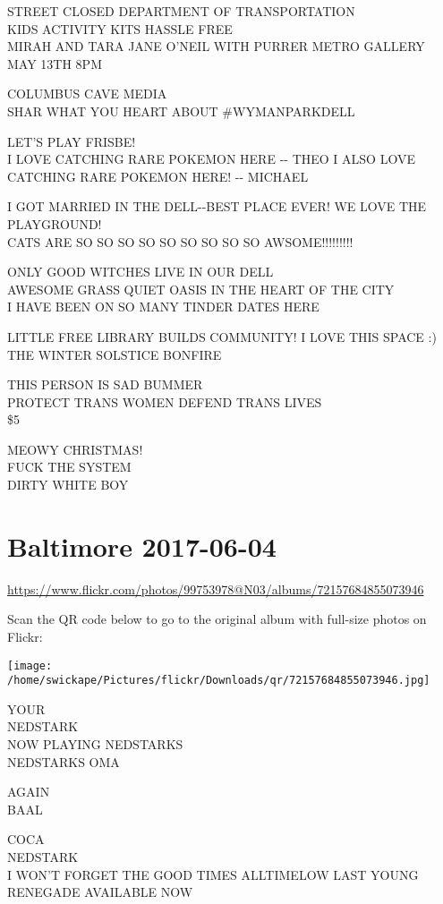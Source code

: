\documentclass[10pt,letterpaper]{article}
\begin{document}
STREET CLOSED DEPARTMENT OF TRANSPORTATION\\
KIDS ACTIVITY KITS HASSLE FREE\\
MIRAH AND TARA JANE O'NEIL WITH PURRER METRO GALLERY MAY 13TH 8PM

COLUMBUS CAVE MEDIA\\
SHAR WHAT YOU HEART ABOUT \#WYMANPARKDELL

LET'S PLAY FRISBE!\\
I LOVE CATCHING RARE POKEMON HERE {-}{-} THEO  I ALSO LOVE CATCHING RARE POKEMON HERE!  {-}{-} MICHAEL

I GOT MARRIED IN THE DELL{-}{-}BEST PLACE EVER!  WE LOVE THE PLAYGROUND!\\
CATS ARE SO SO SO SO SO SO SO SO SO AWSOME!!!!!!!!!

ONLY GOOD WITCHES LIVE IN OUR DELL\\
AWESOME GRASS QUIET OASIS IN THE HEART OF THE CITY\\
I HAVE BEEN ON SO MANY TINDER DATES HERE

LITTLE FREE LIBRARY BUILDS COMMUNITY!  I LOVE THIS SPACE :)\\
THE WINTER SOLSTICE BONFIRE

THIS PERSON IS SAD BUMMER\\
PROTECT TRANS WOMEN DEFEND TRANS LIVES\\
\$5

MEOWY CHRISTMAS!\\
FUCK THE SYSTEM\\
DIRTY WHITE BOY
\pagebreak

\section*{Baltimore 2017-06-04}

\url{https://www.flickr.com/photos/99753978@N03/albums/72157684855073946}

Scan the QR code below to go to the original album with full-size photos on Flickr:

\texttt{[image: /home/swickape/Pictures/flickr/Downloads/qr/72157684855073946.jpg]}
\pagebreak

YOUR\\
NEDSTARK\\
NOW PLAYING NEDSTARKS\\
NEDSTARKS OMA

AGAIN\\
BAAL

COCA\\
NEDSTARK\\
I WON'T FORGET THE GOOD TIMES ALLTIMELOW LAST YOUNG RENEGADE AVAILABLE NOW
\end{document}
